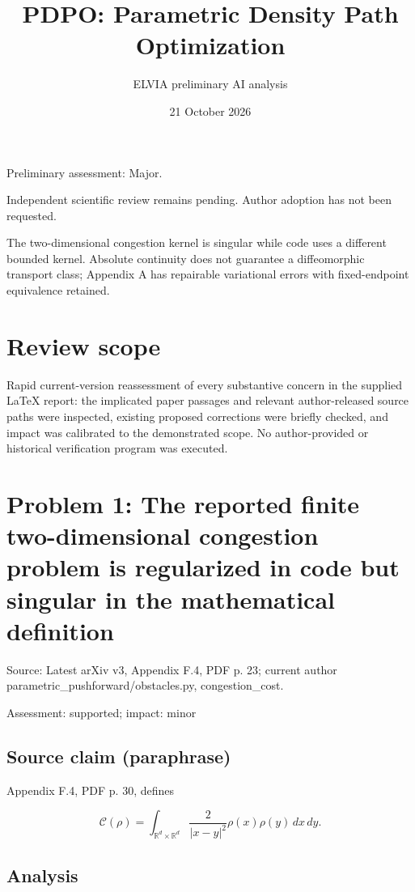 \documentclass[11pt]{article}
\begin{document}
\title{PDPO: Parametric Density Path Optimization}

\author{ELVIA preliminary AI analysis}\date{21 October 2026}\maketitle

Preliminary assessment: Major.\par

Independent scientific review remains pending. Author adoption has not been requested.

The two-dimensional congestion kernel is singular while code uses a different bounded kernel. Absolute continuity does not guarantee a diffeomorphic transport class; Appendix A has repairable variational errors with fixed-endpoint equivalence retained.

\section*{Review scope}

Rapid current-version reassessment of every substantive concern in the supplied LaTeX report: the implicated paper passages and relevant author-released source paths were inspected, existing proposed corrections were briefly checked, and impact was calibrated to the demonstrated scope. No author-provided or historical verification program was executed.

\section*{Problem 1: The reported finite two-dimensional congestion problem is regularized in code but singular in the mathematical definition}

Source: Latest arXiv v3, Appendix F.4, PDF p. 23; current author parametric\_pushforward/obstacles.py, congestion\_cost.

Assessment: supported; impact: minor

\subsection*{Source claim (paraphrase)}

Appendix F.4, PDF p. 30, defines

\[\mathcal C(\rho)= \int_{\mathbb R^d\times\mathbb R^d} \frac{2}{|x-y|^2}\rho(x)\rho(y)\,dx\,dy. \]

\subsection*{Analysis}
\end{document}
